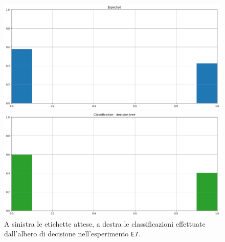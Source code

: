 \documentclass[12pt]{report}
\theoremstyle{definition}
\begin{document}
\begin{figure}
\centering
    \begin{minipage}{0.48\textwidth}
        \includegraphics[width=\linewidth]{images/experiment_kaggle/expected_classification.png}
    \end{minipage}
    \begin{minipage}{0.48\textwidth}
        \includegraphics[width=\linewidth]{images/experiment_kaggle/prediction_classification_dectree.png}
    \end{minipage}
    \caption{A sinistra le etichette attese, a destra le classificazioni effettuate dall'albero di decisione nell'esperimento \texttt{E7}.}
    \label{dt_exp7}
\end{figure} 
\end{document}
